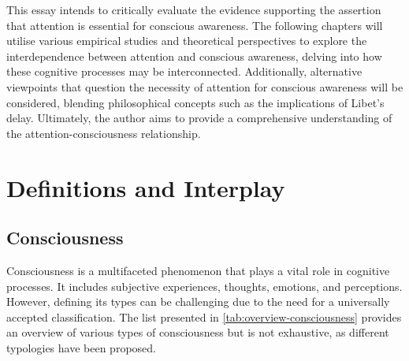 \documentclass[10pt]{article}
\begin{document}
\begin{sloppypar}
  This essay intends to critically evaluate the evidence supporting the assertion that attention is essential for conscious awareness. The following chapters will utilise various empirical studies and theoretical perspectives to explore the interdependence between attention and conscious awareness, delving into how these cognitive processes may be interconnected. Additionally, alternative viewpoints that question the necessity of attention for conscious awareness will be considered, blending philosophical concepts such as the implications of Libet’s delay. Ultimately, the author aims to provide a comprehensive understanding of the attention-consciousness relationship.

  \section{Definitions and Interplay}
  \label{sec:background}

  \subsection{Consciousness}
  \label{sec:consciousness}

  Consciousness is a multifaceted phenomenon that plays a vital role in cognitive processes. It includes subjective experiences, thoughts, emotions, and perceptions. However, defining its types can be challenging due to the need for a universally accepted classification. The list presented in \autoref{tab:overview-consciousness} provides an overview of various types of consciousness but is not exhaustive, as different typologies have been proposed.


\end{sloppypar}
\end{document}
